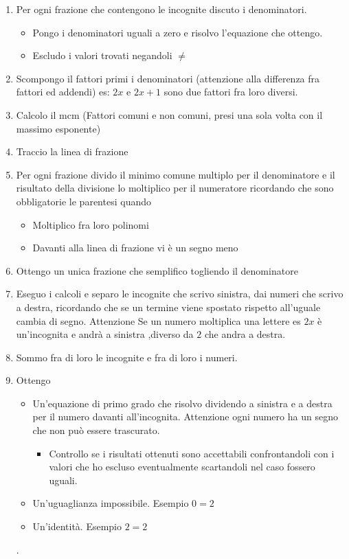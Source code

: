 \begin{enumerate}
\item Per ogni frazione che contengono le incognite discuto i denominatori.
	\begin{itemize}
	\item Pongo i denominatori uguali a zero e risolvo l'equazione che ottengo.
	\item Escludo i valori trovati negandoli $\neq$
	\end{itemize}
	\item  Scompongo il fattori primi i denominatori (attenzione alla differenza fra fattori ed addendi) es: $2x$ e  $2x+1$ sono due fattori fra loro diversi.
	\item Calcolo il mcm (Fattori comuni e non comuni, presi una sola volta con il massimo esponente)
	\item Traccio la linea di frazione 
	\item Per ogni frazione divido il minimo comune multiplo per il denominatore e il risultato della divisione lo moltiplico per il numeratore ricordando che sono obbligatorie le parentesi quando 
	\begin{itemize}
	\item Moltiplico fra loro polinomi
	\item Davanti alla linea di frazione vi è un segno meno
	\end{itemize}
	\item Ottengo un unica frazione che semplifico togliendo il denominatore
	\item Eseguo i calcoli e separo le incognite che scrivo sinistra, dai numeri che scrivo a destra, ricordando che  se un termine viene spostato rispetto all'uguale cambia di segno. Attenzione Se un numero moltiplica una lettere es $2x$ è un'incognita e andrà a sinistra ,diverso da $2$ che andra a destra.
	\item Sommo fra di loro le incognite e fra di loro i numeri.
	\item Ottengo 
	\begin{itemize}
	\item Un'equazione di primo grado che risolvo dividendo  a sinistra e a destra per il numero davanti all'incognita. Attenzione ogni numero ha un segno che non può essere trascurato.
	\begin{itemize}
	\item Controllo se i risultati ottenuti  sono accettabili confrontandoli con i valori che ho escluso eventualmente scartandoli nel caso fossero uguali.
	\end{itemize}
	\item Un'uguaglianza impossibile. Esempio $0=2$
	\item Un'identità. Esempio $2=2$
	\end{itemize}
.\end{enumerate}
